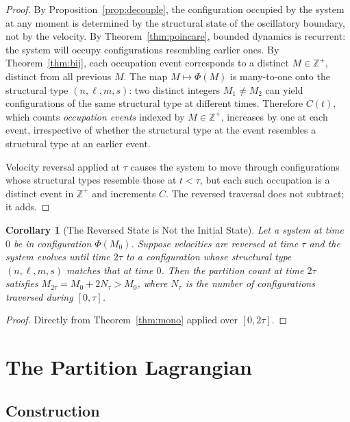 \documentclass[twocolumn,10pt,a4paper]{article}
\theoremstyle{thmstyle}
\newtheorem{corollary}[theorem]{Corollary}
\theoremstyle{definition}
\theoremstyle{remark}
\newcommand{\Zp}{\mathbb{Z}^{+}}
\newcommand{\PhiMap}{\varPhi}
\begin{document}
\begin{proof}
By Proposition~\ref{prop:decouple}, the configuration occupied by the
system at any moment is determined by the structural state of the
oscillatory boundary, not by the velocity. By
Theorem~\ref{thm:poincare}, bounded dynamics is recurrent: the system
will occupy configurations resembling earlier ones. By
Theorem~\ref{thm:bij}, each occupation event corresponds to a distinct
$M\in\Zp$, distinct from all previous $M$. The map
$M\mapsto\PhiMap(M)$ is many-to-one onto the structural type
$(n,\ell,m,s)$: two distinct integers $M_{1}\neq M_{2}$ can yield
configurations of the same structural type at different times.
Therefore $C(t)$, which counts \emph{occupation events} indexed by
$M\in\Zp$, increases by one at each event, irrespective of whether
the structural type at the event resembles a structural type at an
earlier event.

Velocity reversal applied at $\tau$ causes the system to move through
configurations whose structural types resemble those at $t<\tau$, but
each such occupation is a distinct event in $\Zp$ and increments
$C$. The reversed traversal does not subtract; it adds.
\end{proof}

\begin{corollary}[The Reversed State is Not the Initial State]
\label{cor:notinitial}
Let a system at time $0$ be in configuration $\PhiMap(M_{0})$. Suppose
velocities are reversed at time $\tau$ and the system evolves until
time $2\tau$ to a configuration whose structural type
$(n,\ell,m,s)$ matches that at time $0$. Then the partition count at
time $2\tau$ satisfies $M_{2\tau}=M_{0}+2N_{\tau}>M_{0}$, where
$N_{\tau}$ is the number of configurations traversed during $[0,\tau]$.
\end{corollary}

\begin{proof}
Directly from Theorem~\ref{thm:mono} applied over $[0,2\tau]$.
\end{proof}

\section{The Partition Lagrangian}
\label{sec:lagrangian}

\subsection{Construction}
\end{document}
